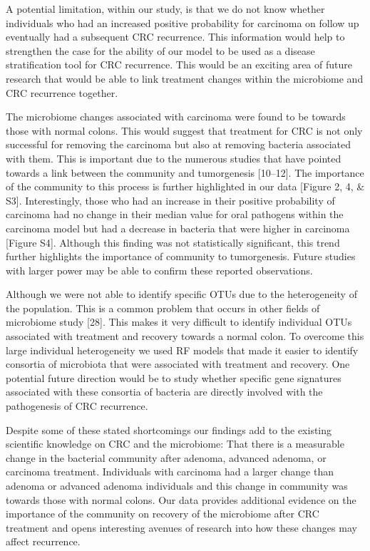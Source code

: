 \documentclass[12pt,]{article}
\begin{document}
A potential limitation, within our study, is that we do not know whether
individuals who had an increased positive probability for carcinoma on
follow up eventually had a subsequent CRC recurrence. This information
would help to strengthen the case for the ability of our model to be
used as a disease stratification tool for CRC recurrence. This would be
an exciting area of future research that would be able to link treatment
changes within the microbiome and CRC recurrence together.

The microbiome changes associated with carcinoma were found to be
towards those with normal colons. This would suggest that treatment for
CRC is not only successful for removing the carcinoma but also at
removing bacteria associated with them. This is important due to the
numerous studies that have pointed towards a link between the community
and tumorgenesis {[}10--12{]}. The importance of the community to this
process is further highlighted in our data {[}Figure 2, 4, \& S3{]}.
Interestingly, those who had an increase in their positive probability
of carcinoma had no change in their median value for oral pathogens
within the carcinoma model but had a decrease in bacteria that were
higher in carcinoma {[}Figure S4{]}. Although this finding was not
statistically significant, this trend further highlights the importance
of community to tumorgenesis. Future studies with larger power may be
able to confirm these reported observations.

Although we were not able to identify specific OTUs due to the
heterogeneity of the population. This is a common problem that occurs in
other fields of microbiome study {[}28{]}. This makes it very difficult
to identify individual OTUs associated with treatment and recovery
towards a normal colon. To overcome this large individual heterogeneity
we used RF models that made it easier to identify consortia of
microbiota that were associated with treatment and recovery. One
potential future direction would be to study whether specific gene
signatures associated with these consortia of bacteria are directly
involved with the pathogenesis of CRC recurrence.

Despite some of these stated shortcomings our findings add to the
existing scientific knowledge on CRC and the microbiome: That there is a
measurable change in the bacterial community after adenoma, advanced
adenoma, or carcinoma treatment. Individuals with carcinoma had a larger
change than adenoma or advanced adenoma individuals and this change in
community was towards those with normal colons. Our data provides
additional evidence on the importance of the community on recovery of
the microbiome after CRC treatment and opens interesting avenues of
research into how these changes may affect recurrence.
\end{document}
